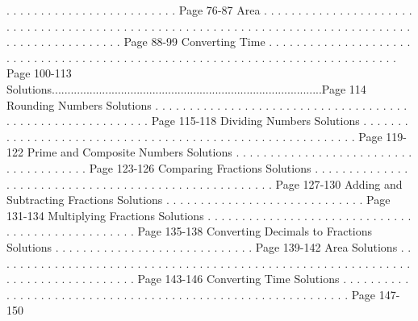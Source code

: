 \documentclass{article}%
\begin{document}
.%
.%
.%
.%
.%
.%
.%
.%
.%
.%
.%
.%
.%
.%
.%
.%
.%
.%
.%
.%
.%
.%
.%
.%
.%
Page 76{-}87%
\newline%
Area%
.%
.%
.%
.%
.%
.%
.%
.%
.%
.%
.%
.%
.%
.%
.%
.%
.%
.%
.%
.%
.%
.%
.%
.%
.%
.%
.%
.%
.%
.%
.%
.%
.%
.%
.%
.%
.%
.%
.%
.%
.%
.%
.%
.%
.%
.%
.%
.%
.%
.%
.%
.%
.%
.%
.%
.%
.%
.%
.%
.%
.%
.%
.%
.%
.%
.%
.%
.%
.%
.%
.%
.%
.%
.%
.%
.%
.%
.%
.%
.%
.%
.%
.%
.%
.%
.%
.%
.%
.%
.%
.%
.%
.%
.%
.%
.%
.%
.%
Page 88{-}99%
\newline%
Converting Time%
.%
.%
.%
.%
.%
.%
.%
.%
.%
.%
.%
.%
.%
.%
.%
.%
.%
.%
.%
.%
.%
.%
.%
.%
.%
.%
.%
.%
.%
.%
.%
.%
.%
.%
.%
.%
.%
.%
.%
.%
.%
.%
.%
.%
.%
.%
.%
.%
.%
.%
.%
.%
.%
.%
.%
.%
.%
.%
.%
.%
.%
.%
.%
.%
.%
.%
.%
.%
.%
.%
.%
.%
.%
.%
.%
.%
.%
.%
Page 100{-}113%
\newline%
Solutions......................................................................................Page 114%
\newline%
Rounding Numbers Solutions%
.%
.%
.%
.%
.%
.%
.%
.%
.%
.%
.%
.%
.%
.%
.%
.%
.%
.%
.%
.%
.%
.%
.%
.%
.%
.%
.%
.%
.%
.%
.%
.%
.%
.%
.%
.%
.%
.%
.%
.%
.%
.%
.%
.%
.%
.%
.%
.%
.%
.%
.%
.%
.%
.%
.%
.%
.%
.%
Page 115{-}118%
\newline%
Dividing Numbers Solutions%
.%
.%
.%
.%
.%
.%
.%
.%
.%
.%
.%
.%
.%
.%
.%
.%
.%
.%
.%
.%
.%
.%
.%
.%
.%
.%
.%
.%
.%
.%
.%
.%
.%
.%
.%
.%
.%
.%
.%
.%
.%
.%
.%
.%
.%
.%
.%
.%
.%
.%
.%
.%
.%
.%
.%
.%
.%
.%
Page 119{-}122%
\newline%
Prime and Composite Numbers Solutions%
.%
.%
.%
.%
.%
.%
.%
.%
.%
.%
.%
.%
.%
.%
.%
.%
.%
.%
.%
.%
.%
.%
.%
.%
.%
.%
.%
.%
.%
.%
.%
.%
.%
.%
.%
.%
.%
.%
Page 123{-}126%
\newline%
Comparing Fractions Solutions%
.%
.%
.%
.%
.%
.%
.%
.%
.%
.%
.%
.%
.%
.%
.%
.%
.%
.%
.%
.%
.%
.%
.%
.%
.%
.%
.%
.%
.%
.%
.%
.%
.%
.%
.%
.%
.%
.%
.%
.%
.%
.%
.%
.%
.%
.%
.%
.%
.%
.%
.%
.%
.%
Page 127{-}130%
\newline%
Adding and Subtracting Fractions Solutions%
.%
.%
.%
.%
.%
.%
.%
.%
.%
.%
.%
.%
.%
.%
.%
.%
.%
.%
.%
.%
.%
.%
.%
.%
.%
.%
.%
.%
.%
Page 131{-}134%
\newline%
Multiplying Fractions Solutions%
.%
.%
.%
.%
.%
.%
.%
.%
.%
.%
.%
.%
.%
.%
.%
.%
.%
.%
.%
.%
.%
.%
.%
.%
.%
.%
.%
.%
.%
.%
.%
.%
.%
.%
.%
.%
.%
.%
.%
.%
.%
.%
.%
.%
.%
.%
.%
.%
.%
Page 135{-}138%
\newline%
Converting Decimals to Fractions Solutions%
.%
.%
.%
.%
.%
.%
.%
.%
.%
.%
.%
.%
.%
.%
.%
.%
.%
.%
.%
.%
.%
.%
.%
.%
.%
.%
.%
.%
.%
Page 139{-}142%
\newline%
Area Solutions%
.%
.%
.%
.%
.%
.%
.%
.%
.%
.%
.%
.%
.%
.%
.%
.%
.%
.%
.%
.%
.%
.%
.%
.%
.%
.%
.%
.%
.%
.%
.%
.%
.%
.%
.%
.%
.%
.%
.%
.%
.%
.%
.%
.%
.%
.%
.%
.%
.%
.%
.%
.%
.%
.%
.%
.%
.%
.%
.%
.%
.%
.%
.%
.%
.%
.%
.%
.%
.%
.%
.%
.%
.%
.%
.%
.%
.%
.%
.%
.%
Page 143{-}146%
\newline%
Converting Time Solutions%
.%
.%
.%
.%
.%
.%
.%
.%
.%
.%
.%
.%
.%
.%
.%
.%
.%
.%
.%
.%
.%
.%
.%
.%
.%
.%
.%
.%
.%
.%
.%
.%
.%
.%
.%
.%
.%
.%
.%
.%
.%
.%
.%
.%
.%
.%
.%
.%
.%
.%
.%
.%
.%
.%
.%
.%
.%
.%
.%
.%
Page 147{-}150%
\newline%
\newpage
\end{document}
